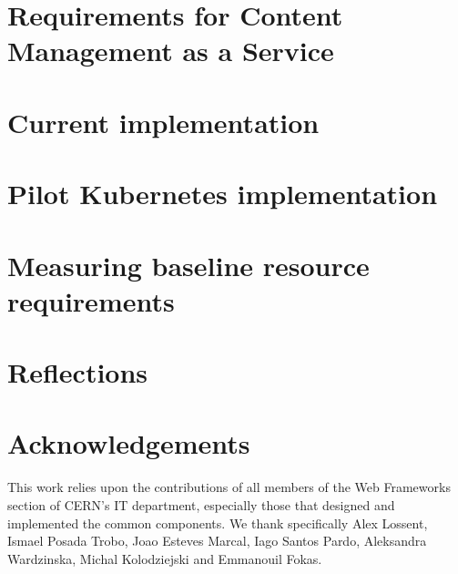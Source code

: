 \documentclass{webofc}
\begin{document}
\section{Requirements for Content Management as a Service}
\label{sec-drupalsvc}


\section{Current implementation}
\label{sec-phys-infra}


\section{Pilot Kubernetes implementation}
\label{sec-k8s-design}


\section{Measuring baseline resource requirements}
\label{sec-experiment}


\section{Reflections}
\label{sec-discussion}


\section*{Acknowledgements}

This work relies upon the contributions of all members of the Web Frameworks section of CERN's IT department,
especially those that designed and implemented the common components.
We thank specifically Alex Lossent, Ismael Posada Trobo, Joao Esteves Marcal, Iago Santos Pardo, Aleksandra Wardzinska, Michal Kolodziejski and Emmanouil Fokas.


\end{document}
